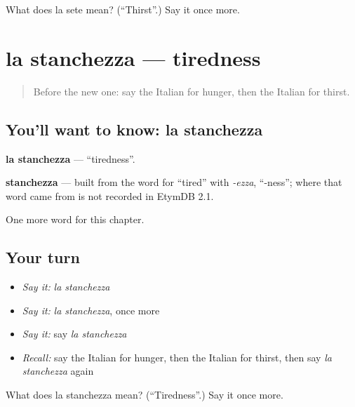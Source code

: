 \begin{tcolorbox}[breakable,colback=teal!4,colframe=teal!35!black,title={Before you move on}]
What does la sete mean? (\textquotedblleft{}Thirst\textquotedblright{}.) Say it once more.
\end{tcolorbox}
\section[la stanchezza]{la stanchezza — tiredness}

\label{lesson:IT-C42-stanchezza}



\begin{quote}
Before the new one: say the Italian for hunger, then the Italian for thirst.
\end{quote}

\subsection*{You'll want to know: la stanchezza}
\textbf{la stanchezza} — \textquotedblleft{}tiredness\textquotedblright{}.

\begin{cousinweb}
\textbf{stanchezza} — built from the word for \textquotedblleft{}tired\textquotedblright{} with \emph{-ezza}, \textquotedblleft{}-ness\textquotedblright{}; where that word came from is not recorded in EtymDB 2.1.
\end{cousinweb}

\begin{grammarlens}[title={What you've built}]
One more word for this chapter.
\end{grammarlens}

\subsection*{Your turn}
\begin{itemize}
\raggedright
  \item \emph{Say it:} \emph{la stanchezza}
  \item \emph{Say it:} \emph{la stanchezza}, once more
  \item \emph{Say it:} say \emph{la stanchezza}
  \item \emph{Recall:} say the Italian for hunger, then the Italian for thirst, then say \emph{la stanchezza} again
\end{itemize}

\begin{tcolorbox}[breakable,colback=teal!4,colframe=teal!35!black,title={Before you move on}]
What does la stanchezza mean? (\textquotedblleft{}Tiredness\textquotedblright{}.) Say it once more.
\end{tcolorbox}
